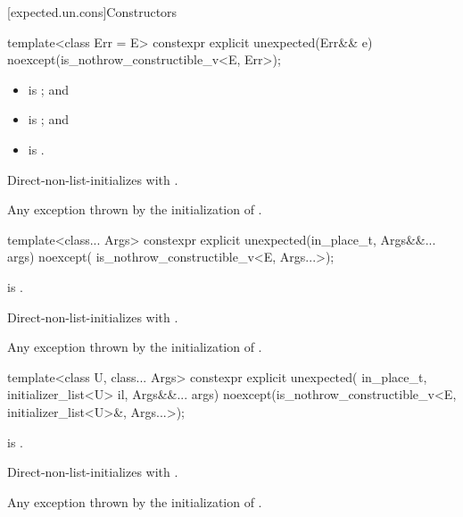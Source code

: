 [expected.un.cons]{Constructors}

%
\begin{itemdecl}
template<class Err = E>
constexpr explicit unexpected(Err&& e) noexcept(is_nothrow_constructible_v<E, Err>);
\end{itemdecl}

\begin{itemdescr}
\pnum
\constraints
\begin{itemize}
\item {} is ; and
\item {} is ; and
\item {} is .
\end{itemize}

\pnum
\effects
Direct-non-list-initializes  with .

\pnum
\throws
Any exception thrown by the initialization of .
\end{itemdescr}

%
\begin{itemdecl}
template<class... Args>
constexpr explicit unexpected(in_place_t, Args&&... args) noexcept(
    is_nothrow_constructible_v<E, Args...>);
\end{itemdecl}

\begin{itemdescr}
\pnum
\constraints
{} is .

\pnum
\effects
Direct-non-list-initializes  with .

\pnum
\throws
Any exception thrown by the initialization of .
\end{itemdescr}

%
\begin{itemdecl}
template<class U, class... Args>
constexpr explicit unexpected(
    in_place_t, initializer_list<U> il,
    Args&&... args) noexcept(is_nothrow_constructible_v<E, initializer_list<U>&,
                                                        Args...>);
\end{itemdecl}

\begin{itemdescr}
\pnum
\constraints
{} is .

\pnum
\effects
Direct-non-list-initializes  with .

\pnum
\throws
Any exception thrown by the initialization of .
\end{itemdescr}


